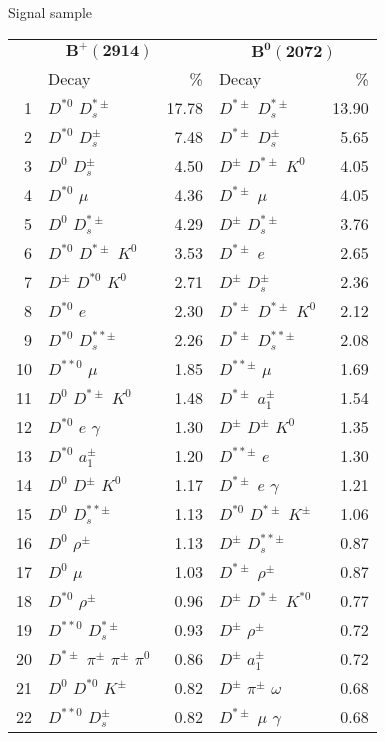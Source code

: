 \documentclass[6pt]{article}
\begin{document}
Signal sample
\begin{tabular}{rlr|lr}
\multicolumn{3}{c|}{$\boldsymbol{B^+(2914)}$} & \multicolumn{2}{c}{$\boldsymbol{B^0(2072)}$} \\
& Decay & \% & Decay & \% \\ \hline \hline
1 & $D^{*0}$ $D_s^{*\pm}$ & 17.78 & $D^{*\pm}$ $D_s^{*\pm}$ & 13.90 \\
2 & $D^{*0}$ $D_s^{\pm}$ & 7.48 & $D^{*\pm}$ $D_s^{\pm}$ & 5.65 \\
3 & $D^0$ $D_s^{\pm}$ & 4.50 & $D^{\pm}$ $D^{*\pm}$ $K^0$ & 4.05 \\
4 & $D^{*0}$ $\mu$ & 4.36 & $D^{*\pm}$ $\mu$ & 4.05 \\
5 & $D^0$ $D_s^{*\pm}$ & 4.29 & $D^{\pm}$ $D_s^{*\pm}$ & 3.76 \\
6 & $D^{*0}$ $D^{*\pm}$ $K^0$ & 3.53 & $D^{*\pm}$ $e$ & 2.65 \\
7 & $D^{\pm}$ $D^{*0}$ $K^0$ & 2.71 & $D^{\pm}$ $D_s^{\pm}$ & 2.36 \\
8 & $D^{*0}$ $e$ & 2.30 & $D^{*\pm}$ $D^{*\pm}$ $K^0$ & 2.12 \\
9 & $D^{*0}$ $D_s^{**\pm}$ & 2.26 & $D^{*\pm}$ $D_s^{**\pm}$ & 2.08 \\
10 & $D^{**0}$ $\mu$ & 1.85 & $D^{**\pm}$ $\mu$ & 1.69 \\
11 & $D^0$ $D^{*\pm}$ $K^0$ & 1.48 & $D^{*\pm}$ $a_1^{\pm}$ & 1.54 \\
12 & $D^{*0}$ $e$ $\gamma$ & 1.30 & $D^{\pm}$ $D^{\pm}$ $K^0$ & 1.35 \\
13 & $D^{*0}$ $a_1^{\pm}$ & 1.20 & $D^{**\pm}$ $e$ & 1.30 \\
14 & $D^0$ $D^{\pm}$ $K^0$ & 1.17 & $D^{*\pm}$ $e$ $\gamma$ & 1.21 \\
15 & $D^0$ $D_s^{**\pm}$ & 1.13 & $D^{*0}$ $D^{*\pm}$ $K^{\pm}$ & 1.06 \\
16 & $D^0$ $\rho^{\pm}$ & 1.13 & $D^{\pm}$ $D_s^{**\pm}$ & 0.87 \\
17 & $D^0$ $\mu$ & 1.03 & $D^{*\pm}$ $\rho^{\pm}$ & 0.87 \\
18 & $D^{*0}$ $\rho^{\pm}$ & 0.96 & $D^{\pm}$ $D^{*\pm}$ $K^{*0}$ & 0.77 \\
19 & $D^{**0}$ $D_s^{*\pm}$ & 0.93 & $D^{\pm}$ $\rho^{\pm}$ & 0.72 \\
20 & $D^{*\pm}$ $\pi^{\pm}$ $\pi^{\pm}$ $\pi^0$ & 0.86 & $D^{\pm}$ $a_1^{\pm}$ & 0.72 \\
21 & $D^0$ $D^{*0}$ $K^{\pm}$ & 0.82 & $D^{\pm}$ $\pi^{\pm}$ $\omega$ & 0.68 \\
22 & $D^{**0}$ $D_s^{\pm}$ & 0.82 & $D^{*\pm}$ $\mu$ $\gamma$ & 0.68 \\

\end{tabular}
\end{document}
